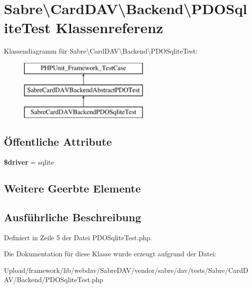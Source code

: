\hypertarget{class_sabre_1_1_card_d_a_v_1_1_backend_1_1_p_d_o_sqlite_test}{}\section{Sabre\textbackslash{}Card\+D\+AV\textbackslash{}Backend\textbackslash{}P\+D\+O\+Sqlite\+Test Klassenreferenz}
\label{class_sabre_1_1_card_d_a_v_1_1_backend_1_1_p_d_o_sqlite_test}
Klassendiagramm für Sabre\textbackslash{}Card\+D\+AV\textbackslash{}Backend\textbackslash{}P\+D\+O\+Sqlite\+Test\+:\begin{figure}[H]
\begin{center}
\leavevmode
\includegraphics[height=3.000000cm]{class_sabre_1_1_card_d_a_v_1_1_backend_1_1_p_d_o_sqlite_test}
\end{center}
\end{figure}
\subsection*{Öffentliche Attribute}
\begin{DoxyCompactItemize}
\item 
\mbox{\label{class_sabre_1_1_card_d_a_v_1_1_backend_1_1_p_d_o_sqlite_test_ac446c9037251f9f622831a5334f5ae0c}} 
{\bfseries \$driver} = \textquotesingle{}sqlite\textquotesingle{}
\end{DoxyCompactItemize}
\subsection*{Weitere Geerbte Elemente}


\subsection{Ausführliche Beschreibung}


Definiert in Zeile 5 der Datei P\+D\+O\+Sqlite\+Test.\+php.



Die Dokumentation für diese Klasse wurde erzeugt aufgrund der Datei\+:\begin{DoxyCompactItemize}
\item 
Upload/framework/lib/webdav/\+Sabre\+D\+A\+V/vendor/sabre/dav/tests/\+Sabre/\+Card\+D\+A\+V/\+Backend/P\+D\+O\+Sqlite\+Test.\+php\end{DoxyCompactItemize}
